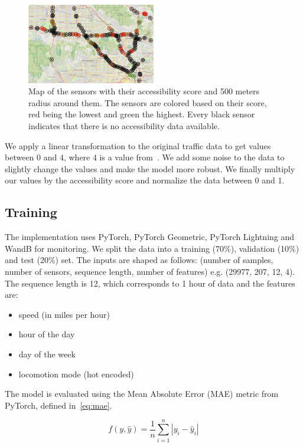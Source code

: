 \begin{figure}[htbp]
    \centering
    \includegraphics[width=0.5\textwidth]{resources/map}
    \caption{
        Map of the sensors with their accessibility score and 500 meters radius around them.
        The sensors are colored based on their score, red being the lowest and green the highest.
        Every black sensor indicates that there is no accessibility data available.
    }
    \label{fig:map}
\end{figure}

We apply a linear transformation to the original traffic data to get values between 0 and 4, where 4 is a value from~\cite{FreedomMobility}.
We add some noise to the data to slightly change the values and make the model more robust.
We finally multiply our values by the accessibility score and normalize the data between 0 and 1.

\subsection{Training}\label{subsec:training}
The implementation uses PyTorch, PyTorch Geometric, PyTorch Lightning and WandB for monitoring.
We split the data into a training (70\%), validation (10\%) and test (20\%) set.
The inputs are shaped as follows: (number of samples, number of sensors, sequence length, number of features) e.g. (29977, 207, 12, 4).
The sequence length is 12, which corresponds to 1 hour of data and the features are:

\begin{itemize}
    \item speed (in miles per hour)
    \item hour of the day
    \item day of the week
    \item locomotion mode (hot encoded)
\end{itemize}

The model is evaluated using the Mean Absolute Error (MAE) metric from PyTorch, defined in~\eqref{eq:mae}.

\begin{equation}
    f(y, \hat{y}) = \frac{1}{n} \sum_{i=1}^{n} \left| y_i - \hat{y}_i \right|\label{eq:mae}
\end{equation}